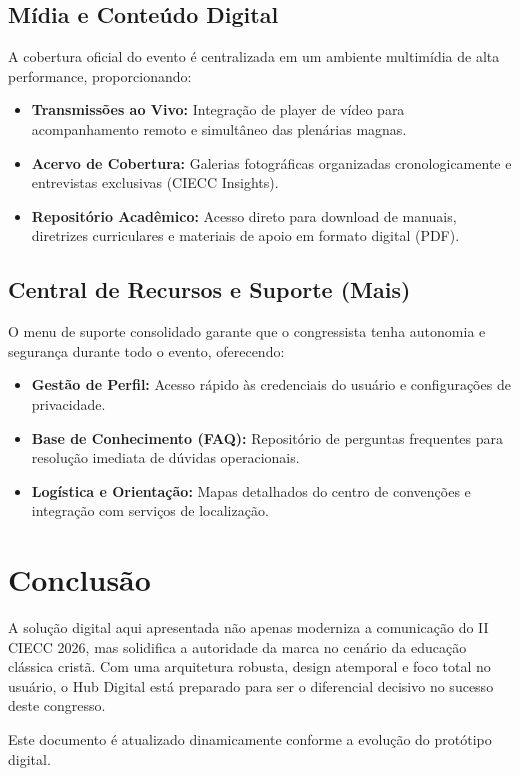 \documentclass[12px,a4paper]{article}
\begin{document}
\subsection{Mídia e Conteúdo Digital}
A cobertura oficial do evento é centralizada em um ambiente multimídia de alta performance, proporcionando:
\begin{itemize}
    \item \textbf{Transmissões ao Vivo:} Integração de player de vídeo para acompanhamento remoto e simultâneo das plenárias magnas.
    \item \textbf{Acervo de Cobertura:} Galerias fotográficas organizadas cronologicamente e entrevistas exclusivas (CIECC Insights).
    \item \textbf{Repositório Acadêmico:} Acesso direto para download de manuais, diretrizes curriculares e materiais de apoio em formato digital (PDF).
\end{itemize}

\subsection{Central de Recursos e Suporte (Mais)}
O menu de suporte consolidado garante que o congressista tenha autonomia e segurança durante todo o evento, oferecendo:
\begin{itemize}
    \item \textbf{Gestão de Perfil:} Acesso rápido às credenciais do usuário e configurações de privacidade.
    \item \textbf{Base de Conhecimento (FAQ):} Repositório de perguntas frequentes para resolução imediata de dúvidas operacionais.
    \item \textbf{Logística e Orientação:} Mapas detalhados do centro de convenções e integração com serviços de localização.
\end{itemize}

\section{Conclusão}
A solução digital aqui apresentada não apenas moderniza a comunicação do II CIECC 2026, mas solidifica a autoridade da marca no cenário da educação clássica cristã. Com uma arquitetura robusta, design atemporal e foco total no usuário, o Hub Digital está preparado para ser o diferencial decisivo no sucesso deste congresso.

\vspace{2cm}
\begin{tcolorbox}[colback=CIECCRed!5,colframe=CIECCRed,title=Nota de Desenvolvimento]
    Este documento é atualizado dinamicamente conforme a evolução do protótipo digital.
\end{tcolorbox}
\end{document}
